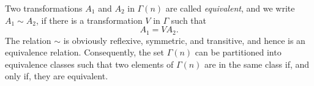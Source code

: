 Two transformations $A_1$ and $A_2$ in $\Gamma(n)$ are called \emph{equivalent}, and we write $A_1 \sim A_2$, if there is a transformation $V$ in $\Gamma$ such that
$$A_1 = V A_2.$$
The relation $\sim$ is obviously reflexive, symmetric, and transitive, and hence is an equivalence relation. Consequently, the set $\Gamma(n)$ can be partitioned into equivalence classes such that two elements of $\Gamma(n)$ are in the same class if, and only if, they are equivalent.

